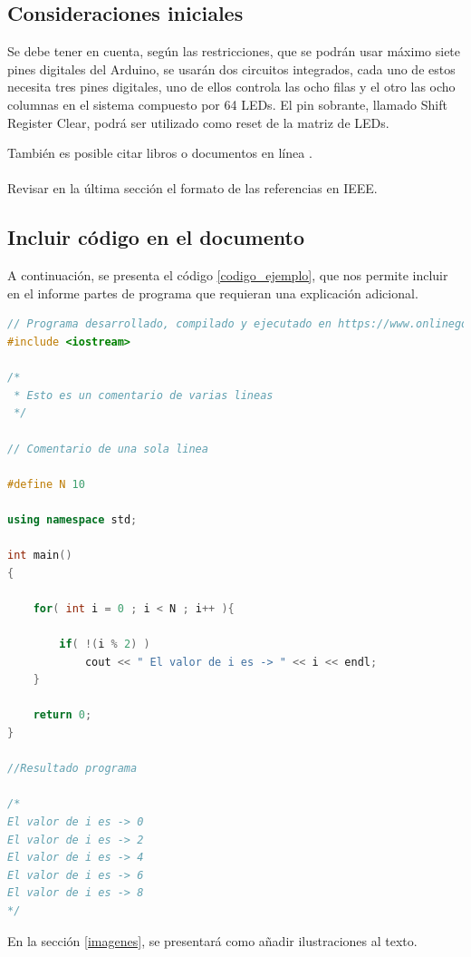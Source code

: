 \documentclass{article}
\begin{document}
\subsection{Consideraciones iniciales}
Se debe tener en cuenta, según las restricciones, que se podrán usar máximo siete pines digitales del Arduino, se usarán dos circuitos integrados, cada uno de estos necesita tres pines digitales, uno de ellos controla las ocho filas y el otro las ocho columnas en el sistema compuesto por 64 LEDs. El pin sobrante, llamado Shift Register Clear, podrá ser utilizado como reset de la matriz de LEDs.

También es posible citar libros \cite{dirac} o documentos en línea \cite{knuthwebsite}.\\\\
Revisar en la última sección el formato de las referencias en IEEE.

\subsection{Incluir código en el documento}
%
A continuación, se presenta el código \ref{codigo_ejemplo}, que nos permite incluir en el informe partes de programa que requieran una explicación adicional.
\begin{lstlisting}[language=C++, label=codigo_ejemplo]
// Programa desarrollado, compilado y ejecutado en https://www.onlinegdb.com
#include <iostream>

/*
 * Esto es un comentario de varias lineas
 */

// Comentario de una sola linea

#define N 10

using namespace std;

int main()
{
    
    for( int i = 0 ; i < N ; i++ ){
        
        if( !(i % 2) )
            cout << " El valor de i es -> " << i << endl;
    }
    
    return 0;
}

//Resultado programa

/*
El valor de i es -> 0
El valor de i es -> 2
El valor de i es -> 4
El valor de i es -> 6
El valor de i es -> 8
*/
\end{lstlisting}
En la sección \ref{imagenes}, se presentará como añadir ilustraciones al texto.
\end{document}

